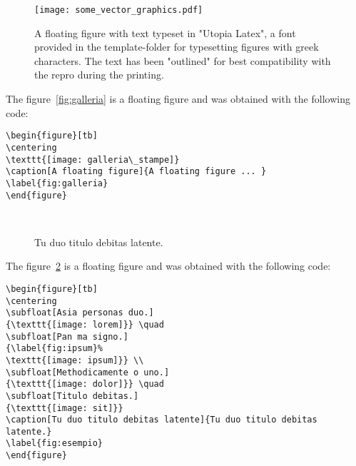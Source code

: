 \begin{figure}[tb] 
\centering 
\texttt{[image: some\_vector\_graphics.pdf]} 
\caption[A floating figure]{A floating figure with text typeset in "Utopia Latex", a font provided in the template-folder for typesetting figures with greek characters. The text has been "outlined" for best compatibility with the repro during the printing.}
\label{fig:vector_graphics} 
\end{figure}


The figure~\ref{fig:galleria} is a floating figure and was obtained with the following code:
\begin{lstlisting}
\begin{figure}[tb] 
\centering 
\texttt{[image: galleria\_stampe]} 
\caption[A floating figure]{A floating figure ... }
\label{fig:galleria} 
\end{figure}
\end{lstlisting}


\lipsum[1-2]

\begin{figure}[tb]
\centering

 \quad
{} \\
 \quad
{}
\caption[Tu duo titulo debitas latente]{Tu duo titulo debitas
latente.}
\label{fig:esempio}
\end{figure}

The figure~\ref{fig:esempio} is a floating figure and was obtained with the following code:
\begin{lstlisting}
\begin{figure}[tb]
\centering
\subfloat[Asia personas duo.]
{\texttt{[image: lorem]}} \quad
\subfloat[Pan ma signo.]
{\label{fig:ipsum}%
\texttt{[image: ipsum]}} \\
\subfloat[Methodicamente o uno.]
{\texttt{[image: dolor]}} \quad
\subfloat[Titulo debitas.]
{\texttt{[image: sit]}}
\caption[Tu duo titulo debitas latente]{Tu duo titulo debitas latente.}
\label{fig:esempio}
\end{figure}
\end{lstlisting}


\lipsum[3-8]
